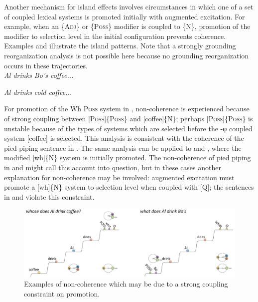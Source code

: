 Another mechanism for island effects involves circumstances in which one of a set of coupled lexical systems is promoted initially with augmented excitation. For example, when an \{A\textsc{dj}\} or \{P\textsc{oss}\} modifier is coupled to \{N\}, promotion of the modifier to selection level in the initial configuration prevents coherence. Examples  and  illustrate the island patterns. Note that a strongly grounding reorganization analysis is not possible here because no grounding reorganization occurs in these trajectories.\\

\noindent \textit{Al drinks Bo's coffee...}
\label{ex:7:25}
    \label{ex:7:25a}
    \label{ex:7:25b}
\z
\z

\label{ex:7:26}
    \label{ex:7:26a}
    \label{ex:7:26b}
\z
\z

\noindent \textit{Al drinks cold coffee...}
\label{ex:7:27}
    \label{ex:7:27a}
    \label{ex:7:27b}
\z
\z

\label{ex:7:28}
    \label{ex:7:28a}
    \label{ex:7:28b}
\z
\z

For promotion of the {\textbar}Wh P\textsc{oss}{\textbar} system in , non-coherence is experienced because of strong coupling between [P\textsc{oss}]\{P\textsc{oss}\} and [coffee]\{N\}; perhaps [P\textsc{oss}]\{P\textsc{oss}\} is unstable because of the types of systems which are selected before the -φ coupled system [coffee] is selected. This analysis is consistent with the coherence of the pied-piping sentence in . The same analysis can be applied to  and , where the modified [wh]\{N\} system is initially promoted. The non-coherence of pied piping in  and  might call this account into question, but in these cases another explanation for non-coherence may be involved: augmented excitation must promote a [wh]\{N\} system to selection level when coupled with [Q]; the sentences in  and  violate this constraint. 

  
\begin{figure}
\includegraphics[width=\textwidth]{figures/Tilsen-img166.png}
\caption{Examples of non-coherence which may be due to a strong coupling constraint on promotion.}
\label{fig:7:22}
\end{figure}
 

